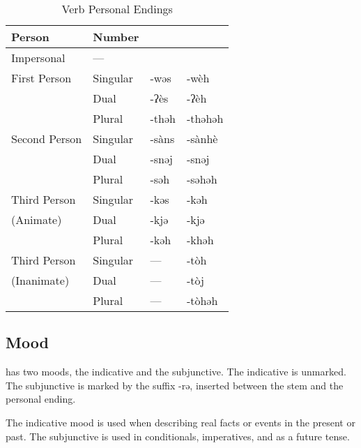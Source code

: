 \begin{table}[h]
\centering
\caption{Verb Personal Endings}
\label{tab:verb personal endings}
\begin{tabu}spread 0pt{ll*{2}{>{\ll}l}}
    \toprule
    Person & Number &
     &  \\ \midrule
    Impersonal    & —        &  \\ \midrule
    First Person  & Singular & -wəs  & -wèh    \\
                  & Dual     & -ʔès  & -ʔèh    \\
                  & Plural   & -thəh & -thəhəh \\ \midrule
    Second Person & Singular & -sàns & -sànhè  \\
                  & Dual     & -snəj & -snəj   \\
                  & Plural   & -səh  & -səhəh  \\ \midrule
    Third Person  & Singular & -kəs  & -kəh    \\
    (Animate)     & Dual     & -kjə  & -kjə    \\
                  & Plural   & -kəh  & -khəh   \\ \midrule
    Third Person  & Singular & —     & -tòh    \\
    (Inanimate)   & Dual     & —     & -tòj    \\
                  & Plural   & —     & -tòhəh  \\ \bottomrule
\end{tabu}
\end{table}

\subsection{Mood}
\Langname{} has two moods, the indicative and the subjunctive.
The indicative is unmarked.
The subjunctive is marked by the suffix {\ll -rə}, inserted between the stem
and the personal ending.

The indicative mood is used when describing real facts or events in the present
or past.
The subjunctive is used in conditionals, imperatives, and as a future tense.

